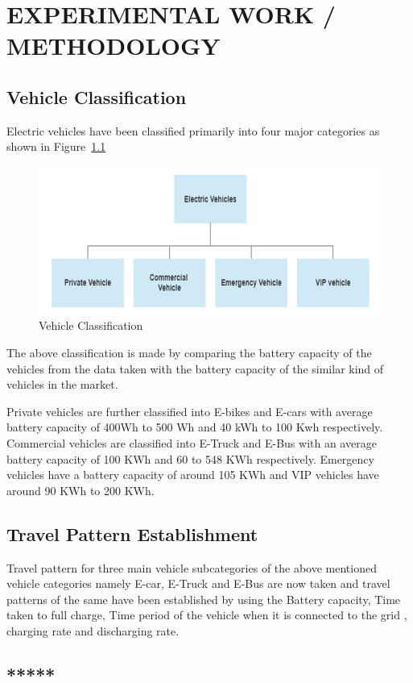 	\chapter{EXPERIMENTAL WORK / METHODOLOGY}
	\label{chap:work}
	
	\section{Vehicle Classification}
	
	 Electric vehicles have been classified primarily into four major categories as shown in Figure~\ref{fig:classification} 
	 	
			\begin{figure}[h]
				\centering
				\includegraphics[width=0.7\linewidth]{classification}
				\caption{Vehicle Classification}
				\label{fig:classification}
			\end{figure}
		
	The above classification is made by comparing the battery capacity of the vehicles from the data taken with the battery capacity of the similar kind of vehicles in the market.

	\par {Private vehicles are further classified into E-bikes and E-cars with average battery capacity of 400Wh to 500 Wh and 40 kWh to 100 Kwh respectively. Commercial vehicles are classified into E-Truck and E-Bus with an average battery capacity of 100 KWh and 60 to 548 KWh respectively. Emergency vehicles have a battery capacity of around 105 KWh and VIP vehicles have around 90 KWh to 200 KWh.
	}
	
	\section{Travel Pattern Establishment}
	
	Travel pattern for three main vehicle subcategories of the above mentioned vehicle categories namely E-car, E-Truck and E-Bus are now taken and travel patterns of the same have been established by using the Battery capacity, Time taken to full charge, Time period of the vehicle when it is connected to the grid , charging rate and discharging rate.
	
	\section{*****}